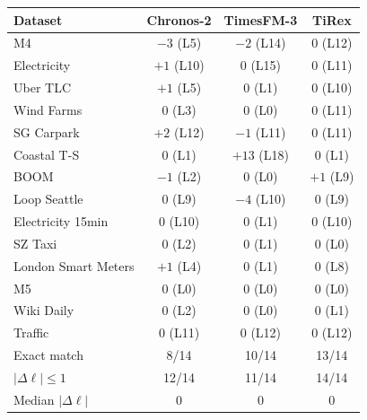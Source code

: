 \begin{tabular}{lccc}
\toprule
Dataset & Chronos-2 & TimesFM-3 & TiRex \\
\midrule
M4 & $-3$ (L5) & $-2$ (L14) & 0 (L12) \\
Electricity & $+1$ (L10) & 0 (L15) & 0 (L11) \\
Uber TLC & $+1$ (L5) & 0 (L1) & 0 (L10) \\
Wind Farms & 0 (L3) & 0 (L0) & 0 (L11) \\
SG Carpark & $+2$ (L12) & $-1$ (L11) & 0 (L11) \\
Coastal T-S & 0 (L1) & $+13$ (L18) & 0 (L1) \\
BOOM & $-1$ (L2) & 0 (L0) & $+1$ (L9) \\
Loop Seattle & 0 (L9) & $-4$ (L10) & 0 (L9) \\
Electricity 15min & 0 (L10) & 0 (L1) & 0 (L10) \\
SZ Taxi & 0 (L2) & 0 (L1) & 0 (L0) \\
London Smart Meters & $+1$ (L4) & 0 (L1) & 0 (L8) \\
M5 & 0 (L0) & 0 (L0) & 0 (L0) \\
Wiki Daily & 0 (L2) & 0 (L0) & 0 (L1) \\
Traffic & 0 (L11) & 0 (L12) & 0 (L12) \\
\midrule
Exact match & 8/14 & 10/14 & 13/14 \\
$|\Delta\ell|\le 1$ & 12/14 & 11/14 & 14/14 \\
Median $|\Delta\ell|$ & 0 & 0 & 0 \\
\bottomrule
\end{tabular}
